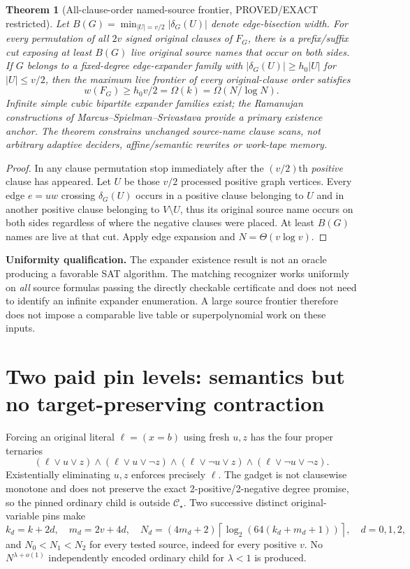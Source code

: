 \documentclass[11pt]{article}
\newtheorem{theorem}{Theorem}
\newcommand{\CS}{\mathcal C_\star}
\begin{document}
\begin{theorem}[All-clause-order named-source frontier, PROVED/EXACT restricted]
Let $B(G)=\min_{|U|=v/2}|\delta_G(U)|$ denote edge-bisection width. For \emph{every} permutation of all $2v$ signed original clauses of $F_G$, there is a prefix/suffix cut exposing at least $B(G)$ live original source names that occur on both sides. If $G$ belongs to a fixed-degree edge-expander family with $|\delta_G(U)|\ge h_0|U|$ for $|U|\le v/2$, then the maximum live frontier of every original-clause order satisfies
\[
w(F_G)\ge h_0v/2=\Omega(k)=\Omega(N/\log N).
\]
Infinite simple cubic bipartite expander families exist; the Ramanujan constructions of Marcus--Spielman--Srivastava \cite{mss} provide a primary existence anchor. The theorem constrains \emph{unchanged source-name clause scans}, not arbitrary adaptive deciders, affine/semantic rewrites or work-tape memory.
\end{theorem}
\begin{proof}
In any clause permutation stop immediately after the $(v/2)$th \emph{positive} clause has appeared. Let $U$ be those $v/2$ processed positive graph vertices. Every edge $e=uw$ crossing $\delta_G(U)$ occurs in a positive clause belonging to $U$ and in another positive clause belonging to $V\setminus U$, thus its original source name occurs on both sides regardless of where the negative clauses were placed. At least $B(G)$ names are live at that cut. Apply edge expansion and $N=\Theta(v\log v)$.
\end{proof}
\noindent\textbf{Uniformity qualification.} The expander existence result is not an oracle producing a favorable SAT algorithm. The matching recognizer works uniformly on \emph{all} source formulas passing the directly checkable certificate and does not need to identify an infinite expander enumeration. A large source frontier therefore does not impose a comparable live table or superpolynomial work on these inputs.

\section{Two paid pin levels: semantics but no target-preserving contraction}
Forcing an original literal $\ell=(x=b)$ using fresh $u,z$ has the four proper ternaries
\[
(\ell\vee u\vee z)\wedge(\ell\vee u\vee\neg z)
\wedge(\ell\vee\neg u\vee z)\wedge(\ell\vee\neg u\vee\neg z).
\]
Existentially eliminating $u,z$ enforces precisely $\ell$. The gadget is not clausewise monotone and does not preserve the exact 2-positive/2-negative degree promise, so the pinned ordinary child is outside $\CS$. Two successive distinct original-variable pins make
\[
k_d=k+2d,\quad m_d=2v+4d,\quad
N_d=(4m_d+2)\left\lceil\log_2(64(k_d+m_d+1))\right\rceil,\quad d=0,1,2,
\]
and $N_0<N_1<N_2$ for every tested source, indeed for every positive $v$. No $N^{\lambda+o(1)}$ independently encoded ordinary child for $\lambda<1$ is produced.
\end{document}
